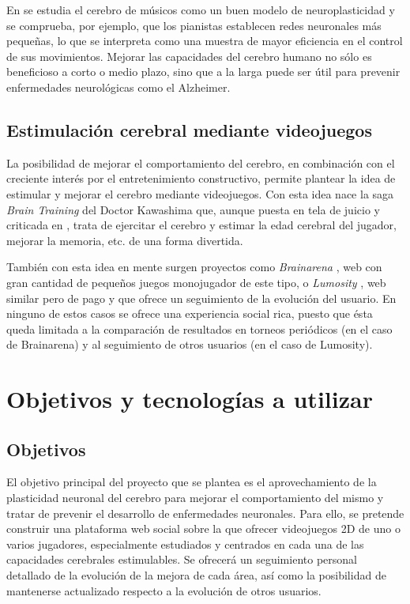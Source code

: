 \documentclass[12pt,a4paper]{article}
\begin{document}
En \cite{musicians} se estudia el cerebro de músicos como un buen modelo de neuroplasticidad y se comprueba, por ejemplo, que los pianistas establecen redes neuronales más pequeñas, lo que se interpreta como una muestra de mayor eficiencia en el control de sus movimientos. Mejorar las capacidades del cerebro humano no sólo es beneficioso a corto o medio plazo, sino que a la larga puede ser útil para prevenir enfermedades neurológicas como el Alzheimer.

\subsection{Estimulación cerebral mediante videojuegos}

La posibilidad de mejorar el comportamiento del cerebro, en combinación con el creciente interés por el entretenimiento constructivo, permite plantear la idea de estimular y mejorar el cerebro mediante videojuegos. Con esta idea nace la saga {\it Brain Training} del Doctor Kawashima \cite{braintraining} que, aunque puesta en tela de juicio y criticada en \cite{cortex}, trata de ejercitar el cerebro y estimar la edad cerebral del jugador, mejorar la memoria, etc. de una forma divertida.

También con esta idea en mente surgen proyectos como {\it Brainarena} \cite{brainarena}, web con gran cantidad de pequeños juegos monojugador de este tipo,  o {\it Lumosity} \cite{lumosity}, web similar pero de pago y que ofrece un seguimiento de la evolución del usuario. En ninguno de estos casos se ofrece una experiencia social rica, puesto que ésta queda limitada a la comparación de resultados en torneos periódicos (en el caso de Brainarena) y al seguimiento de otros usuarios (en el caso de Lumosity).

\section{Objetivos y tecnologías a utilizar}


\subsection{Objetivos}

El objetivo principal del proyecto que se plantea es el aprovechamiento de la plasticidad neuronal del cerebro para mejorar el comportamiento del mismo y tratar de prevenir el desarrollo de enfermedades neuronales. Para ello, se pretende construir una plataforma web social sobre la que ofrecer videojuegos 2D de uno o varios jugadores, especialmente estudiados y centrados en cada una de las capacidades cerebrales estimulables. Se ofrecerá un seguimiento personal detallado de la evolución de la mejora de cada área, así como la posibilidad de mantenerse actualizado respecto a la evolución de otros usuarios.
\end{document}
